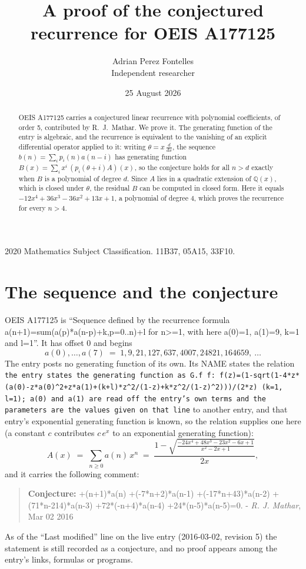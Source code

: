 \documentclass[11pt,a4paper]{article}
\title{A proof of the conjectured recurrence for OEIS A177125}
\author{Adrian Perez Fontelles\\ \small Independent researcher}
\date{25 August 2026}
\theoremstyle{plain}
\theoremstyle{definition}
\begin{document}
\maketitle

\begin{abstract}
OEIS A177125 carries a conjectured linear recurrence with polynomial coefficients, of
order 5, contributed by R.~J.~Mathar. We prove it. The generating function of the
entry is algebraic, and the recurrence is equivalent to the vanishing of an explicit
differential operator applied to it: writing $\theta=x\,\frac{d}{dx}$, the sequence
$b(n)=\sum_{i}p_{i}(n)a(n-i)$ has generating function
$B(x)=\sum_{i}x^{i}\,(p_{i}(\theta+i)A)(x)$, so the conjecture holds for all $n>d$ exactly
when $B$ is a polynomial of degree $d$. Since $A$ lies in a quadratic extension of
$\mathbb{Q}(x)$, which is closed under $\theta$, the residual $B$ can be computed in
closed form. Here it equals $- 12 x^{4} + 36 x^{3} - 36 x^{2} + 13 x + 1$, a polynomial of degree $4$, which proves
the recurrence for every $n>4$.
\end{abstract}

\noindent\small 2020 Mathematics Subject Classification. 11B37, 05A15, 33F10.\normalsize

\section{The sequence and the conjecture}

OEIS A177125 is ``Sequence defined by the recurrence formula a(n+1)=sum(a(p)*a(n-p)+k,p=0..n)+l for n>=1, with here a(0)=1, a(1)=9, k=1 and l=1''. It has offset $0$ and begins
\[
a(0),\dots,a(7)\;=\;1, 9, 21, 127, 637, 4007, 24821, 164659,\ \dots
\]
The entry posts no generating function of its own. Its NAME states the
relation \texttt{the entry states the generating function as G.f f: f(z)=(1-sqrt(1-4*z*(a(0)-z*a(0)\textasciicircum{}2+z*a(1)+(k+l)*z\textasciicircum{}2/(1-z)+k*z\textasciicircum{}2/(1-z)\textasciicircum{}2)))/(2*z) (k=1, l=1); a(0) and a(1) are read off the entry's own terms and the parameters are the values given on that line} to another entry, and that entry's exponential generating
function is known, so the relation supplies one here (a constant $c$ contributes
$c\,e^{x}$ to an exponential generating function):
\begin{equation}\label{eq:gf}
A(x)\;=\;\sum_{n\ge 0} a(n)\,x^{n}\;=\;\frac{1 - \sqrt{\frac{- 24 x^{4} + 48 x^{3} - 23 x^{2} - 6 x + 1}{x^{2} - 2 x + 1}}}{2 x} ,
\end{equation}
and it carries the following comment:
\begin{quote}\small
\textbf{Conjecture:} +(n+1)*a(n) +(-7*n+2)*a(n-1) +(-17*n+43)*a(n-2) +(71*n-214)*a(n-3) +72*(-n+4)*a(n-4) +24*(n-5)*a(n-5)=0. - \emph{R. J. Mathar}, Mar 02 2016
\end{quote}
As of the ``Last modified'' line on the live entry (2016-03-02, revision 5) the
statement is still recorded as a conjecture, and no proof appears among the entry's links,
formulas or programs.
\end{document}
